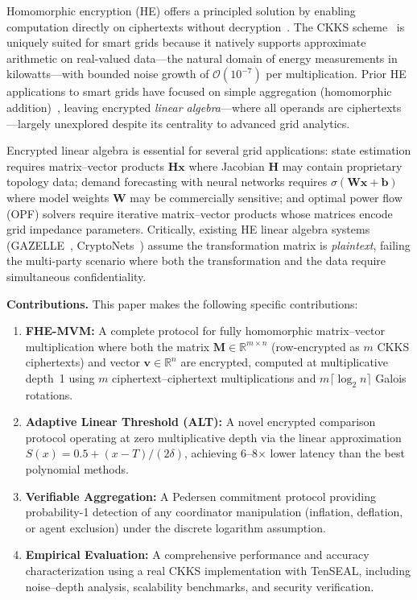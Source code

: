 \documentclass[conference]{IEEEtran}
\begin{document}
Homomorphic encryption (HE) offers a principled solution by enabling computation directly on ciphertexts without decryption~\cite{Gentry2009}. The CKKS scheme~\cite{Cheon2017} is uniquely suited for smart grids because it natively supports approximate arithmetic on real-valued data---the natural domain of energy measurements in kilowatts---with bounded noise growth of $\mathcal{O}(10^{-7})$ per multiplication. Prior HE applications to smart grids have focused on simple aggregation (homomorphic addition)~\cite{Li2010,Garcia2011}, leaving encrypted \emph{linear algebra}---where all operands are ciphertexts---largely unexplored despite its centrality to advanced grid analytics.

Encrypted linear algebra is essential for several grid applications: state estimation requires matrix--vector products $\mathbf{H}\mathbf{x}$ where Jacobian $\mathbf{H}$ may contain proprietary topology data; demand forecasting with neural networks requires $\sigma(\mathbf{W}\mathbf{x}+\mathbf{b})$ where model weights $\mathbf{W}$ may be commercially sensitive; and optimal power flow (OPF) solvers require iterative matrix--vector products whose matrices encode grid impedance parameters. Critically, existing HE linear algebra systems (GAZELLE~\cite{Juvekar2018}, CryptoNets~\cite{CryptoNets2016}) assume the transformation matrix is \emph{plaintext}, failing the multi-party scenario where both the transformation and the data require simultaneous confidentiality.

\textbf{Contributions.} This paper makes the following specific contributions:
\begin{enumerate}
    \item \textbf{FHE-MVM:} A complete protocol for fully homomorphic matrix--vector multiplication where both the matrix $\mathbf{M} \in \mathbb{R}^{m \times n}$ (row-encrypted as $m$ CKKS ciphertexts) and vector $\mathbf{v} \in \mathbb{R}^n$ are encrypted, computed at multiplicative depth~1 using $m$ ciphertext--ciphertext multiplications and $m\lceil\log_2 n\rceil$ Galois rotations.
    \item \textbf{Adaptive Linear Threshold (ALT):} A novel encrypted comparison protocol operating at zero multiplicative depth via the linear approximation $S(x)=0.5+(x{-}T)/(2\delta)$, achieving 6--8$\times$ lower latency than the best polynomial methods.
    \item \textbf{Verifiable Aggregation:} A Pedersen commitment protocol providing probability-1 detection of any coordinator manipulation (inflation, deflation, or agent exclusion) under the discrete logarithm assumption.
    \item \textbf{Empirical Evaluation:} A comprehensive performance and accuracy characterization using a real CKKS implementation with TenSEAL, including noise--depth analysis, scalability benchmarks, and security verification.
\end{enumerate}
\end{document}
